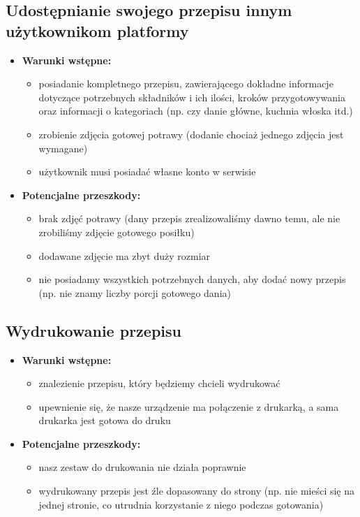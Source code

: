\documentclass{article}
\begin{document}
\subsection{Udostępnianie swojego przepisu innym użytkownikom platformy}
  \begin{itemize}
    \item \textbf{Warunki wstępne:}
      \begin{itemize}
        \item posiadanie kompletnego przepisu, zawierającego dokładne informacje dotyczące potrzebnych składników i ich ilości, kroków przygotowywania oraz informacji o kategoriach (np. czy danie główne, kuchnia włoska itd.)
        \item zrobienie zdjęcia gotowej potrawy (dodanie chociaż jednego zdjęcia jest wymagane)
        \item użytkownik musi posiadać własne konto w serwisie
      \end{itemize}
    \item \textbf{Potencjalne przeszkody:}
      \begin{itemize}
        \item brak zdjęć potrawy (dany przepis zrealizowaliśmy dawno temu, ale nie zrobiliśmy zdjęcie gotowego posiłku)
        \item dodawane zdjęcie ma zbyt duży rozmiar
        \item nie posiadamy wszystkich potrzebnych danych, aby dodać nowy przepis (np. nie znamy liczby porcji gotowego dania)
      \end{itemize}
  \end{itemize}
\subsection{Wydrukowanie przepisu}
  \begin{itemize}
    \item \textbf{Warunki wstępne:}
      \begin{itemize}
        \item znalezienie przepisu, który będziemy chcieli wydrukować
        \item upewnienie się, że nasze urządzenie ma połączenie z drukarką, a sama drukarka jest gotowa do druku
      \end{itemize}
    \item \textbf{Potencjalne przeszkody:}
      \begin{itemize}
        \item nasz zestaw do drukowania nie działa poprawnie
        \item wydrukowany przepis jest źle dopasowany do strony (np. nie mieści się na jednej stronie, co utrudnia korzystanie z niego podczas gotowania)
      \end{itemize}
  \end{itemize}
\end{document}
